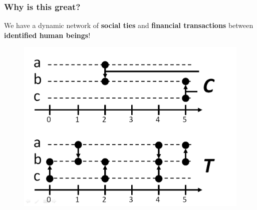 \documentclass{beamer}
\begin{document}
\begin{frame}
\begin{center}
\begin{figure}
		\end{figure}
	\end{center}	
\end{frame}


\begin{frame}
	\frametitle{Why is this great?}
	{\footnotesize We have a dynamic network of \textbf{social ties} and \textbf{financial transactions} between \textbf{identified human beings}!}
	\begin{center}
		\begin{figure}
			\includegraphics[width=.8\linewidth]{./figures/animation_dt/deltat-certif-0.png}
		\end{figure}
	\end{center}
\end{frame}
\end{document}
